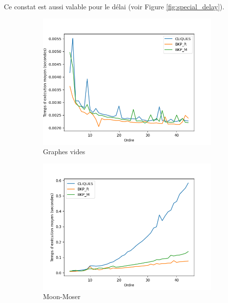 \documentclass[12pt,a4paper]{article}
\begin{document}
Ce constat est aussi valable pour le délai (voir Figure \ref{fig:special_delay}).
\begin{figure}[ht]
  \centering
  \begin{subfigure}[b]{0.42\textwidth}
    \includegraphics[width=\textwidth]{images/delay_pivot_empty_plot.png}
    \caption{Graphes vides}
    \label{subfig:delay_empty}
  \end{subfigure}
  \begin{subfigure}[b]{0.42\textwidth}
    \includegraphics[width=\textwidth]{images/delay_pivot_turan_plot.png}
    \caption{Moon-Moser}
    \label{subfig:delay_turan}
  \end{subfigure}
  \begin{subfigure}[b]{0.42\textwidth}

\end{subfigure}
\end{figure}
\end{document}
